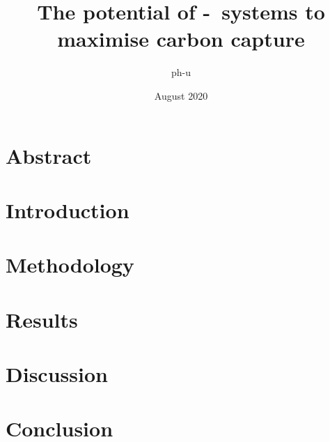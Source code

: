 \documentclass[a4paper,11pt]{article}
\title{The potential of \phy-\bac\ systems to maximise carbon capture}
\author{ph-u}
\date{August 2020}
\begin{document}
\maketitle



\section{Abstract}


\section{Introduction}


\section{Methodology}


\section{Results}



\section{Discussion}



\section{Conclusion}




\nocite{*}\printbibliography
\clearpage

\end{document}
